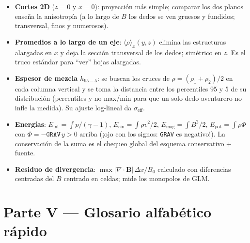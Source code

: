 \documentclass[11pt,a4paper]{article}
\newcommand{\B}{\mathbf{B}}
\newcommand{\code}[1]{\texttt{#1}}
\newcommand{\term}[1]{\textbf{#1}}
\begin{document}
\begin{itemize}[nosep]
  \item \term{Cortes 2D} ($z=0$ y $x=0$): proyección más simple; comparar los dos planos
  enseña la anisotropía (a lo largo de $B$ los dedos se ven gruesos y fundidos;
  transversal, finos y numerosos).
  \item \term{Promedios a lo largo de un eje}: $\langle\rho\rangle_x(y,z)$ elimina las
  estructuras alargadas en $x$ y deja la sección transversal de los dedos; simétrico en
  $z$. Es el truco estándar para ``ver'' hojas alargadas.
  \item \term{Espesor de mezcla $h_{95-5}$}: se buscan los cruces de
  $\rho=(\rho_1+\rho_2)/2$ en cada columna vertical y se toma la distancia entre los
  percentiles 95 y 5 de su distribución (percentiles y no max/min para que un solo dedo
  aventurero no infle la medida). Su ajuste log-lineal da $\sigma_\mathrm{eff}$.
  \item \term{Energías}: $E_\mathrm{int}=\int p/(\gamma-1)$, $E_\mathrm{cin}=\int\rho
  v^2/2$, $E_\mathrm{mag}=\int B^2/2$, $E_\mathrm{pot}=\int\rho\Phi$ con
  $\Phi=-\code{GRAV}\,y>0$ arriba (¡ojo con los signos: \code{GRAV} es negativo!). La
  conservación de la suma es el chequeo global del esquema conservativo + fuente.
  \item \term{Residuo de divergencia}: $\max|\nabla\cdot\B|\,\Delta x/B_0$ calculado con
  diferencias centradas del $B$ centrado en celdas; mide los monopolos de GLM.
\end{itemize}

\part*{Parte V --- Glosario alfabético rápido}
\end{document}
